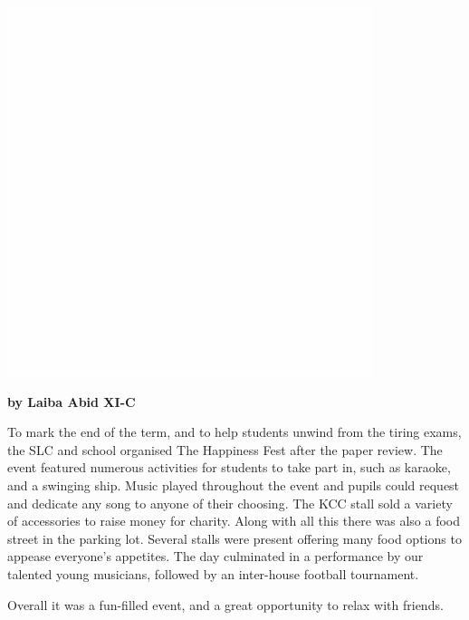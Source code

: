 \documentclass{article}
\begin{document}
\begin{multicols}{2}
\includegraphics[scale=0.1]{w}





\textbf{by Laiba Abid XI-C}


To mark the end of the term, and to help students unwind from the tiring exams, the SLC and school organised The Happiness Fest after the paper review. The event featured numerous activities for students to take part in, such as karaoke, and a swinging ship. Music played throughout the event and pupils could request and dedicate any song to anyone of their choosing. The KCC stall sold a variety of accessories to raise money for charity. Along with all this there was also a food street in the parking lot. Several stalls were present offering many food options to appease everyone’s appetites. The day culminated in a performance by our talented young musicians, followed by an inter-house football tournament. 

Overall it was a fun-filled event, and a great opportunity to relax with friends.



\end{multicols}
\pagebreak 
\end{document}
